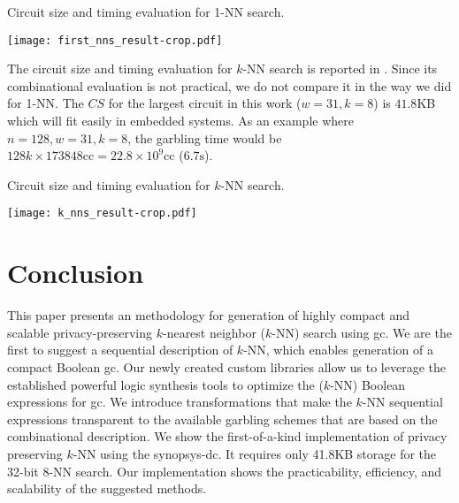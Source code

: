 \begin{table}
\centering
\caption{Circuit size and timing evaluation for 1-NN search.}
\label{tab:1_nns}
\texttt{[image: first\_nns\_result-crop.pdf]}
\end{table}

The circuit size and timing evaluation for $k$-NN search is reported in .
Since its combinational evaluation is not practical, we do not compare it in the way we did for 1-NN.
The $\mathit{CS}$ for the largest circuit in this work ($w=31, k=8$) is $41.8$KB which will fit easily in embedded systems.
As an example where $n=128, w=31, k=8$, the garbling time would be $128k\times 173848\text{cc} = 22.8\times 10^9\text{cc}$ ($6.7\text{s}$).

\begin{table}
\centering
\caption{Circuit size and timing evaluation for $k$-NN search.}
\label{tab:k_nns}
\texttt{[image: k\_nns\_result-crop.pdf]}
\end{table}

\section{Conclusion}\label{sec:knn-conc}
This paper presents an methodology for generation of highly compact and scalable privacy-preserving $k$-nearest neighbor ($k$-NN) search using \acrshort{gc}.
We are the first to suggest a sequential description of $k$-NN, which enables generation of a compact Boolean \acrshort{gc}.
Our newly created custom libraries allow us to leverage the established powerful logic synthesis tools to optimize the ($k$-NN) Boolean expressions for \acrshort{gc}.
We introduce transformations that make the $k$-NN sequential expressions transparent to the available garbling schemes that are based on the combinational description.
We show the first-of-a-kind implementation of privacy preserving $k$-NN using the \acrfull{synopsys-dc}.
It requires only 41.8KB storage for the 32-bit 8-NN search.
Our implementation shows the practicability, efficiency, and scalability of the suggested methods.
